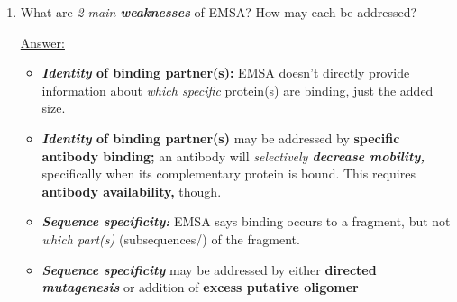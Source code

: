 \documentclass{article}
\newenvironment{QandA}{\begin{enumerate}[label=\bfseries Q\arabic*.]}
                       {\end{enumerate}}
\newenvironment{answered}{\par\normalfont\underline{Answer:}}{}
\begin{document}
\begin{QandA}
  \item{What are \textit{2 main \textbf{weaknesses}} of EMSA? How may each be addressed?}
    \begin{answered}
    \begin{itemize}
      \item{\textbf{\textit{Identity} of binding partner(s):} EMSA doesn't directly provide information about \textit{which specific} protein(s) are binding, just the added size.}
      \item{\textbf{\textit{Identity} of binding partner(s)} may be addressed by \textbf{specific antibody binding;} an antibody will \textit{selectively \textbf{decrease mobility,}} specifically when its complementary protein is bound. This requires \textbf{antibody availability,} though.}
      \item{\textbf{\textit{Sequence specificity:}} EMSA says binding occurs to a fragment, but not \textit{which part(s)} (subsequences/) of the fragment.}
      \item{\textbf{\textit{Sequence specificity}} may be addressed by either \textbf{directed \textit{mutagenesis}} or addition of \textbf{excess putative oligomer}}
    \end{itemize}
    \end{answered}
\end{QandA}
\end{document}
